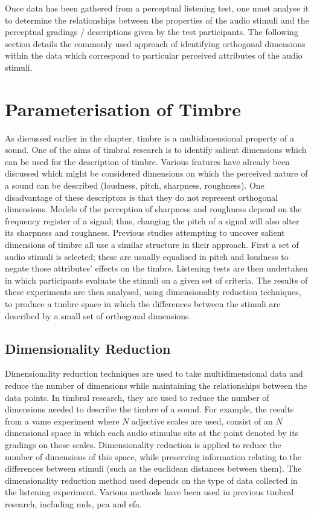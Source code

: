 			Once data has been gathered from a perceptual listening test, one must analyse it to determine the
			relationships between the properties of the audio stimuli and the perceptual gradings /
			descriptions given by the test participants. The following section details the commonly used
			approach of identifying orthogonal dimensions within the data which correspond to particular
			perceived attributes of the audio stimuli.

\section{Parameterisation of Timbre}
\label{sec:Timbre-Parameterisation}
	As discussed earlier in the chapter, timbre is a multidimensional property of a sound. One of the aims of timbral
	research is to identify salient dimensions which can be used for the description of timbre. Various features have
	already been discussed which might be considered dimensions on which the perceived nature of a sound can be
	described (loudness, pitch, sharpness, roughness). One disadvantage of these descriptors is that they do not
	represent orthogonal dimensions. Models of the perception of sharpness and roughness depend on the frequency
	register of a signal; thus, changing the pitch of a signal will also alter its sharpness and roughness. Previous
	studies attempting to uncover salient dimensions of timbre all use a similar structure in their approach.  First a
	set of audio stimuli is selected; these are usually equalised in pitch and loudness to negate those attributes'
	effects on the timbre. Listening tests are then undertaken in which participants evaluate the stimuli on a given
	set of criteria. The results of these experiments are then analysed, using dimensionality reduction techniques, to
	produce a timbre space in which the differences between the stimuli are described by a small set of orthogonal
	dimensions.

	\subsection{Dimensionality Reduction}
	\label{sec:Timbre-Parameterisation-DimensionalityReduction}
		Dimensionality reduction techniques are used to take multidimensional data and reduce the number of
		dimensions while maintaining the relationships between the data points. In timbral research, they are used
		to reduce the number of dimensions needed to describe the timbre of a sound. For example, the results from
		a \acrshort{vame} experiment where $N$ adjective scales are used, consist of an $N$ dimensional space in
		which each audio stimulus sits at the point denoted by its gradings on those scales. Dimensionality
		reduction is applied to reduce the number of dimensions of this space, while preserving information
		relating to the differences between stimuli (such as the euclidean distances between them). The
		dimensionality reduction method used depends on the type of data collected in the listening experiment.
		Various methods have been used in previous timbral research, including \acrfull{mds}, \acrfull{pca} and
		\acrfull{efa}.

